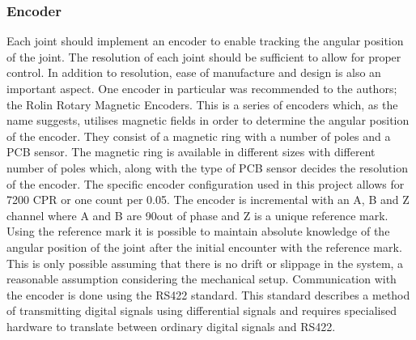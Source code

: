 \subsubsection{Encoder} %
\label{ssub:encoder}
Each joint should implement an encoder to enable tracking the angular position of the joint.
The resolution of each joint should be sufficient to allow for proper control.
In addition to resolution, ease of manufacture and design is also an important aspect.
One encoder in particular was recommended to the authors; the Rolin Rotary Magnetic Encoders.
This is a series of encoders which, as the name suggests, utilises magnetic fields in order to determine the angular position of the encoder.
They consist of a magnetic ring with a number of poles and a PCB sensor.
The magnetic ring is available in different sizes with different number of poles which, along with the type of PCB sensor decides the resolution of the encoder.
The specific encoder configuration used in this project allows for 7200 CPR or one count per 0.05\degree.
The encoder is incremental with an A, B and Z channel where A and B are 90\degree out of phase and Z is a unique reference mark.
Using the reference mark it is possible to maintain absolute knowledge of the angular position of the joint after the initial encounter with the reference mark.
This is only possible assuming that there is no drift or slippage in the system, a reasonable assumption considering the mechanical setup.
Communication with the encoder is done using the RS422 standard.
This standard describes a method of transmitting digital signals using differential signals and requires specialised hardware to translate between ordinary digital signals and RS422.

